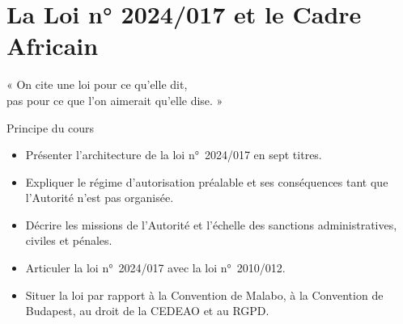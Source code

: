 
\chapter{La Loi n° 2024/017 et le Cadre Africain}
\label{chap:loi}

\epigraph{%
    « On cite une loi pour ce qu'elle dit,\\
    pas pour ce que l'on aimerait qu'elle dise. »%
}{Principe du cours}


\begin{boxobjectifs}
\begin{itemize}
    \item Présenter l'architecture de la loi n°~2024/017 en sept titres.
    \item Expliquer le régime d'autorisation préalable et ses conséquences
          tant que l'Autorité n'est pas organisée.
    \item Décrire les missions de l'Autorité et l'échelle des sanctions
          administratives, civiles et pénales.
    \item Articuler la loi n°~2024/017 avec la loi n°~2010/012.
    \item Situer la loi par rapport à la Convention de Malabo, à la
          Convention de Budapest, au droit de la CEDEAO et au RGPD.
\end{itemize}
\end{boxobjectifs}


